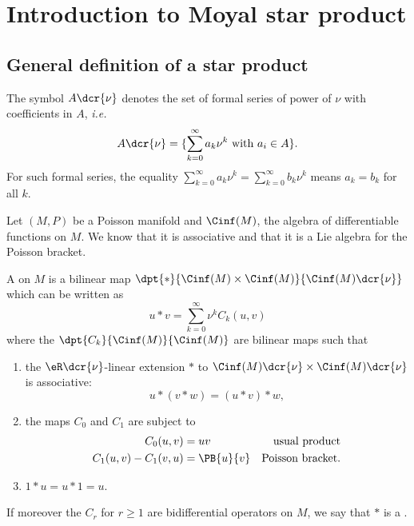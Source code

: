 
\section{Introduction to Moyal star product}\label{app:Moyal}

\subsection{General definition of a star product}

The symbol $A\dcr{\nu}$ denotes the set of formal series of power of $\nu$ with coefficients in $A$, \textit{i.e.}
\[
	A\dcr{\nu}=\{\sum_{k=0}^{\infty}a_k\nu^k\text{ with } a_i\in A\}.
\]
For such formal series, the equality $\sum_{k=0}^{\infty}a_k\nu^k=\sum_{k=0}^{\infty}b_k\nu^k$ means $a_k=b_k$ for all $k$.

Let $(M,P)$ be a Poisson manifold and $\Cinf(M)$, the algebra of differentiable functions on $M$. We know that it is associative and that it is a Lie algebra for the Poisson bracket.


\begin{definition}
	A  on $M$ is a bilinear map $\dpt{\ast}{\Cinf(M)\times\Cinf(M)}{\Cinf(M)\dcr{\nu}}$ which can be written as
	\begin{equation}
		u\ast v=\sum_{k=0}^{\infty}\nu^kC_k(u,v)
	\end{equation}
	where the $\dpt{C_k}{\Cinf(M)}{\Cinf(M)}$ are bilinear maps such that
	\renewcommand{\labelenumi}{(\roman{enumi})}
	\begin{enumerate}
		\item the $\eR\dcr{\nu}$-linear extension $\ast$ to $\Cinf(M)\dcr{\nu}\times\Cinf(M)\dcr{\nu}$ is associative:
		      \begin{equation}
			      u\ast(v\ast w)=(u\ast v)\ast w,
		      \end{equation}


		\item the maps $C_0$ and $C_1$ are subject to
		      \begin{equation}
			      \begin{aligned}
				      C_0(u,v)          & =uv        & \text{usual product}    \\
				      C_1(u,v)-C_1(v,u) & =\PB{u}{v} & \text{Poisson bracket}.
			      \end{aligned}
		      \end{equation}

		\item $1\ast u=u\ast 1=u$.
	\end{enumerate}
	If moreover the $C_r$ for $r\ge 1$ are bidifferential operators on $M$, we say that $\ast$ is a .

\end{definition}

